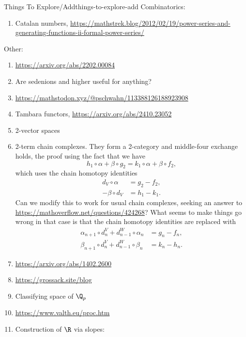 \begin{remark}{Things To Explore/Add}{things-to-explore-add}
    Combinatorics:
    \begin{enumerate}
        \item Catalan numbers, \url{https://mathstrek.blog/2012/02/19/power-series-and-generating-functions-ii-formal-power-series/}
    \end{enumerate}
    Other:
    \begin{enumerate}
        \item \url{https://arxiv.org/abs/2202.00084}
        \item Are sedenions and higher useful for anything?
        \item \url{https://mathstodon.xyz/@pschwahn/113388126188923908}
        \item Tambara functors, \url{https://arxiv.org/abs/2410.23052}
        \item 2-vector spaces
        \item 2-term chain complexes. They form a 2-category and middle-four exchange holds, the proof using the fact that we have
            \[
                h_{1}\circ\alpha+\beta\circ g_{2}%
                =%
                k_{1}\circ\alpha+\beta\circ f_{2},%
            \]%
            which uses the chain homotopy identities
            \begin{align*}
                d_{V}\circ\alpha  &= g_{2}-f_{2},\\
                -\beta\circ d_{V} &= h_{1}-k_{1}.
            \end{align*}
            Can we modify this to work for usual chain complexes, seeking an answer to \url{https://mathoverflow.net/questions/424268}? What seems to make things go wrong in that case is that the chain homotopy identities are replaced with
            \begin{align*}
                \alpha_{n+1}\circ d^{V}_{n}+d^{W}_{n-1}\circ\alpha_{n} &= g_{n}-f_{n},\\
                \beta_{n+1}\circ d^{V}_{n}+d^{W}_{n-1}\circ\beta_{n}   &= k_{n}-h_{n}.
            \end{align*}
        \item \url{https://arxiv.org/abs/1402.2600}
        \item \url{https://grossack.site/blog}
        \item Classifying space of $\Q_{p}$
        \item \url{https://www.valth.eu/proc.htm}
        \item Construction of $\R$ via slopes:
            \begin{enumerate}

\end{enumerate}
\end{enumerate}
\end{remark}
